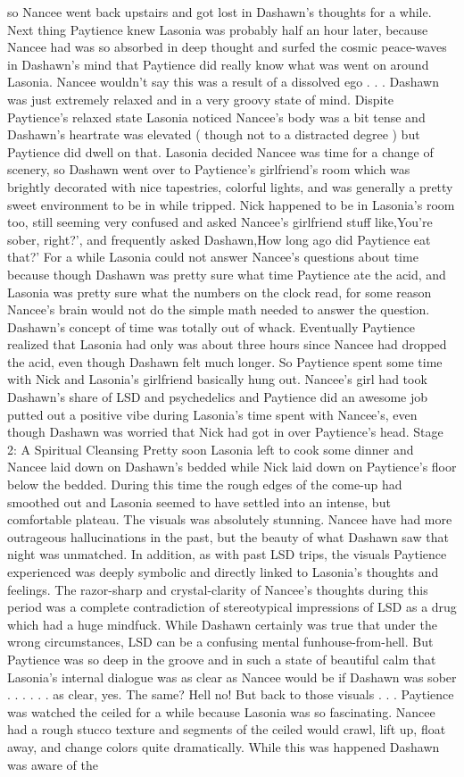 \documentclass[12pt]{book}
\begin{document}
so Nancee went back upstairs and got lost in Dashawn's thoughts for a while. Next thing Paytience knew Lasonia was probably half an hour later, because Nancee had was so absorbed in deep thought and surfed the cosmic peace-waves in Dashawn's mind that Paytience did really know what was went on around Lasonia. Nancee wouldn't say this was a result of a dissolved ego . . .  Dashawn was just extremely relaxed and in a very groovy state of mind. Dispite Paytience's relaxed state Lasonia noticed Nancee's body was a bit tense and Dashawn's heartrate was elevated ( though not to a distracted degree ) but Paytience did dwell on that. Lasonia decided Nancee was time for a change of scenery, so Dashawn went over to Paytience's girlfriend's room which was brightly decorated with nice tapestries, colorful lights, and was generally a pretty sweet environment to be in while tripped. Nick happened to be in Lasonia's room too, still seeming very confused and asked Nancee's girlfriend stuff like,You're sober, right?', and frequently asked Dashawn,How long ago did Paytience eat that?' For a while Lasonia could not answer Nancee's questions about time because though Dashawn was pretty sure what time Paytience ate the acid, and Lasonia was pretty sure what the numbers on the clock read, for some reason Nancee's brain would not do the simple math needed to answer the question. Dashawn's concept of time was totally out of whack. Eventually Paytience realized that Lasonia had only was about three hours since Nancee had dropped the acid, even though Dashawn felt much longer. So Paytience spent some time with Nick and Lasonia's girlfriend basically hung out. Nancee's girl had took Dashawn's share of LSD and psychedelics and Paytience did an awesome job putted out a positive vibe during Lasonia's time spent with Nancee's, even though Dashawn was worried that Nick had got in over Paytience's head. Stage 2: A Spiritual Cleansing Pretty soon Lasonia left to cook some dinner and Nancee laid down on Dashawn's bedded while Nick laid down on Paytience's floor below the bedded. During this time the rough edges of the come-up had smoothed out and Lasonia seemed to have settled into an intense, but comfortable plateau. The visuals was absolutely stunning. Nancee have had more outrageous hallucinations in the past, but the beauty of what Dashawn saw that night was unmatched. In addition, as with past LSD trips, the visuals Paytience experienced was deeply symbolic and directly linked to Lasonia's thoughts and feelings. The razor-sharp and crystal-clarity of Nancee's thoughts during this period was a complete contradiction of stereotypical impressions of LSD as a drug which had a huge mindfuck. While Dashawn certainly was true that under the wrong circumstances, LSD can be a confusing mental funhouse-from-hell. But Paytience was so deep in the groove and in such a state of beautiful calm that Lasonia's internal dialogue was as clear as Nancee would be if Dashawn was sober . . .   . . .  as clear, yes. The same? Hell no! But back to those visuals . . .  Paytience was watched the ceiled for a while because Lasonia was so fascinating. Nancee had a rough stucco texture and segments of the ceiled would crawl, lift up, float away, and change colors quite dramatically. While this was happened Dashawn was aware of the 
\end{document}
